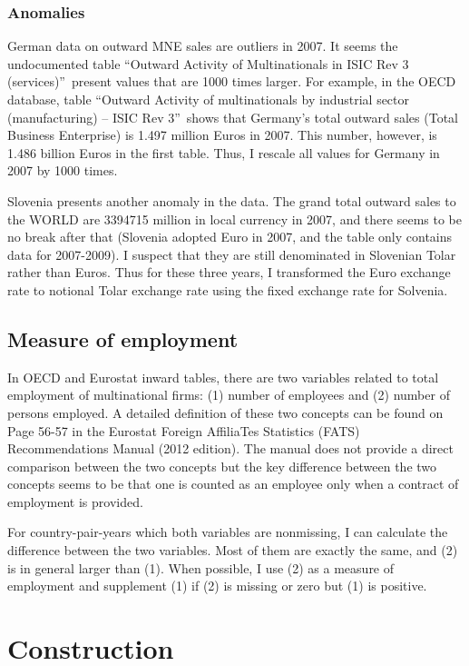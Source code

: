 \documentclass[notitlepage,11pt]{article}%
\begin{document}
\subsubsection{Anomalies}

German data on outward MNE sales are outliers in 2007. It seems the
undocumented table \textquotedblleft Outward Activity of Multinationals in
ISIC Rev 3 (services)\textquotedblright\ present values that are 1000 times
larger. For example, in the OECD database, table \textquotedblleft Outward
Activity of multinationals by industrial sector (manufacturing) -- ISIC Rev
3\textquotedblright\ shows that Germany's total outward sales (Total Business
Enterprise) is 1.497 million Euros in 2007. This number, however, is 1.486
billion Euros in the first table. Thus, I rescale all values for Germany in
2007 by 1000 times. 

Slovenia presents another anomaly in the data. The grand total outward sales
to the WORLD are 3394715 million in local currency in 2007, and there seems to
be no break after that (Slovenia adopted Euro in 2007, and the table only
contains data for 2007-2009). I suspect that they are still denominated in
Slovenian Tolar rather than Euros. Thus for these three years, I transformed
the Euro exchange rate to notional Tolar exchange rate using the fixed
exchange rate for Solvenia.

\subsection{Measure of employment}

In OECD and Eurostat inward tables, there are two variables related to total
employment of multinational firms: (1) number of employees and (2) number of
persons employed. A detailed definition of these two concepts can be found on
Page 56-57 in the Eurostat Foreign AffiliaTes Statistics (FATS)
Recommendations Manual (2012 edition). The manual does not provide a direct
comparison between the two concepts but the key difference between the two
concepts seems to be that one is counted as an employee only when a contract
of employment is provided.

For country-pair-years which both variables are nonmissing, I can calculate
the difference between the two variables. Most of them are exactly the same,
and (2) is in general larger than (1). When possible, I use (2) as a measure
of employment and supplement (1) if (2) is missing or zero but (1) is positive.

\section{Construction}
\end{document}
